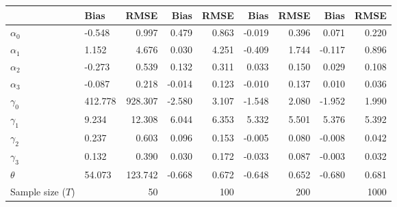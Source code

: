 
\begin{tabular}[t]{llrrrrrrr}
\toprule
  & Bias & RMSE & Bias & RMSE & Bias & RMSE & Bias & RMSE\\
\midrule
$\alpha_{0}$ & -0.548 & 0.997 & 0.479 & 0.863 & -0.019 & 0.396 & 0.071 & 0.220\\
$\alpha_{1}$ & 1.152 & 4.676 & 0.030 & 4.251 & -0.409 & 1.744 & -0.117 & 0.896\\
$\alpha_{2}$ & -0.273 & 0.539 & 0.132 & 0.311 & 0.033 & 0.150 & 0.029 & 0.108\\
$\alpha_{3}$ & -0.087 & 0.218 & -0.014 & 0.123 & -0.010 & 0.137 & 0.010 & 0.036\\
$\gamma_{0}$ & 412.778 & 928.307 & -2.580 & 3.107 & -1.548 & 2.080 & -1.952 & 1.990\\
$\gamma_{1}$ & 9.234 & 12.308 & 6.044 & 6.353 & 5.332 & 5.501 & 5.376 & 5.392\\
$\gamma_{2}$ & 0.237 & 0.603 & 0.096 & 0.153 & -0.005 & 0.080 & -0.008 & 0.042\\
$\gamma_{3}$ & 0.132 & 0.390 & 0.030 & 0.172 & -0.033 & 0.087 & -0.003 & 0.032\\
$\theta$ & 54.073 & 123.742 & -0.668 & 0.672 & -0.648 & 0.652 & -0.680 & 0.681\\
Sample size ($T$) &  & 50 &  & 100 &  & 200 &  & 1000\\
\bottomrule
\end{tabular}
